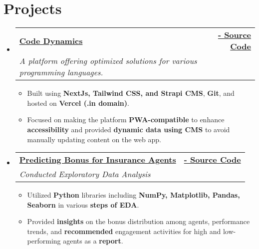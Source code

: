 \documentclass[letterpaper,11pt]{article}
\makeatletter
\newcommand{\resumeItem}[2]{
  \item\small{
    \textbf{#1}{ #2 \vspace{-2pt}}
  }
}
\newcommand{\resumeSubheading}[4]{
  \vspace{-1pt}\item
    \begin{tabular*}{0.97\textwidth}[t]{l@{\extracolsep{\fill}}r}
      \textbf{#1} & #2 \\
      \textit{\small#3} & \textit{\small #4} \\
    \end{tabular*}\vspace{-5pt}
}
\newcommand{\resumeSubSubheading}[2]{
    \begin{tabular*}{0.97\textwidth}{l@{\extracolsep{\fill}}r}
      \textit{\small#1} & \textit{\small #2} \\
    \end{tabular*}\vspace{-5pt}
}
\newcommand{\resumeSubItem}[2]{\resumeItem{#1}{#2}\vspace{-4pt}}
\newcommand{\resumeSubHeadingListStart}{\begin{itemize}[leftmargin=*]}
\newcommand{\resumeSubHeadingListEnd}{\end{itemize}}
\newcommand{\resumeItemListStart}{\begin{itemize}}
\newcommand{\resumeItemListEnd}{\end{itemize}\vspace{-5pt}}
\makeatother
\begin{document}
      

      
%

\section{Projects}
  \resumeSubHeadingListStart
     \resumeSubheading{\href{https://www.codedynamics.in/}{Code Dynamics}}{{\href{https://github.com/AnkitRajCode/CodeDynamics}{\bf - Source Code}}}{A platform offering optimized solutions for various programming languages.}{}
      \resumeItemListStart
        \resumeItem{}{Built using \textbf{NextJs, Tailwind CSS, and Strapi CMS}, \textbf{Git}, and hosted on \textbf{Vercel (.in domain)}.}
        \resumeItem{}{Focused on making the platform \textbf{PWA-compatible} to enhance \textbf{accessibility} and provided \textbf{dynamic data using CMS} to avoid manually updating content on the web app.}
    \resumeItemListEnd
    \resumeSubheading{\href{https://github.com/satyajeetramnit/Data-Science-Projects/tree/main/Agent-Bonus-Life-Insurance_Company}{Predicting Bonus for Insurance Agents}}{{\href{https://github.com/satyajeetramnit/Data-Science-Projects/tree/main/Agent-Bonus-Life-Insurance_Company}{\bf - Source Code}}}{Conducted Exploratory Data Analysis}{}
      \resumeItemListStart
        \resumeItem{}{Utilized \textbf{Python} libraries including \textbf{NumPy, Matplotlib, Pandas, Seaborn} in various \textbf{steps of EDA}.}
        \resumeItem{}{Provided \textbf{insights} on the bonus distribution among agents, performance trends, and \textbf{recommended} engagement activities for high and low-performing agents as a \textbf{report}.}
    \resumeItemListEnd
  \resumeSubHeadingListEnd
\end{document}
